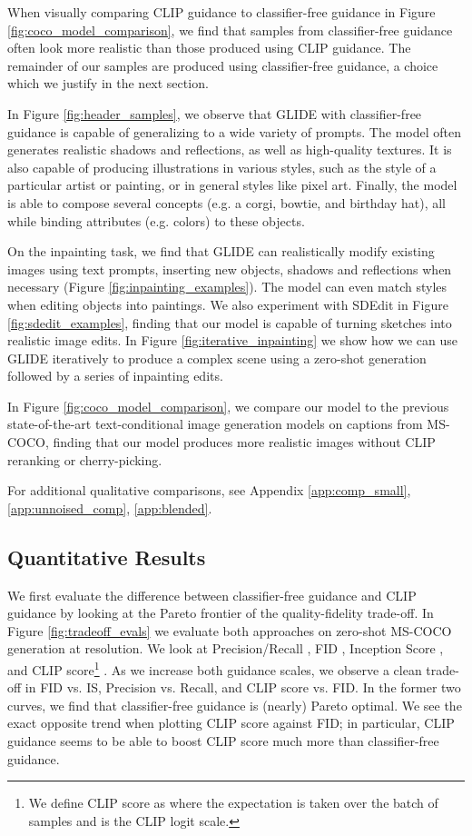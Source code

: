 \documentclass{article}
\newcommand{\modelname}{GLIDE}
\begin{document}
When visually comparing CLIP guidance to classifier-free guidance in Figure \ref{fig:coco_model_comparison}, we find that samples from classifier-free guidance often look more realistic than those produced using CLIP guidance. The remainder of our samples are produced using classifier-free guidance, a choice which we justify in the next section.

In Figure \ref{fig:header_samples}, we observe that \modelname{} with classifier-free guidance is capable of generalizing to a wide variety of prompts. The model often generates realistic shadows and reflections, as well as high-quality textures. It is also capable of producing illustrations in various styles, such as the style of a particular artist or painting, or in general styles like pixel art. Finally, the model is able to compose several concepts (e.g. a corgi, bowtie, and birthday hat), all while binding attributes (e.g. colors) to these objects.

On the inpainting task, we find that \modelname{} can realistically modify existing images using text prompts, inserting new objects, shadows and reflections when necessary (Figure \ref{fig:inpainting_examples}). The model can even match styles when editing objects into paintings. We also experiment with SDEdit \mbox{\citep{sdedit}} in Figure \ref{fig:sdedit_examples}, finding that our model is capable of turning sketches into realistic image edits. In Figure \ref{fig:iterative_inpainting} we show how we can use \modelname{} iteratively to produce a complex scene using a zero-shot generation followed by a series of inpainting edits.
 
In Figure \ref{fig:coco_model_comparison}, we compare our model to the previous state-of-the-art text-conditional image generation models on captions from MS-COCO, finding that our model produces more realistic images without CLIP reranking or cherry-picking.

For additional qualitative comparisons, see Appendix \ref{app:comp_small}, \ref{app:unnoised_comp}, \ref{app:blended}. 

\subsection{Quantitative Results}
\label{sec:quantitative_results}

We first evaluate the difference between classifier-free guidance and CLIP guidance by looking at the Pareto frontier of the quality-fidelity trade-off. In Figure \ref{fig:tradeoff_evals} we evaluate both approaches on zero-shot MS-COCO generation at  resolution. We look at Precision/Recall \mbox{\citep{precrecall}}, FID \mbox{\citep{fid}}, Inception Score \mbox{\citep{inceptionscore}}, and CLIP score\footnote{We define CLIP score as  where the expectation is taken over the batch of samples and  is the CLIP logit scale.} \citep{clip}. As we increase both guidance scales, we observe a clean trade-off in FID vs. IS, Precision vs. Recall, and CLIP score vs. FID. In the former two curves, we find that classifier-free guidance is (nearly) Pareto optimal. We see the exact opposite trend when plotting CLIP score against FID; in particular, CLIP guidance seems to be able to boost CLIP score much more than classifier-free guidance.
\end{document}
